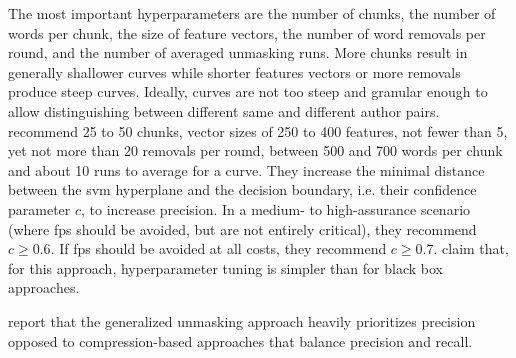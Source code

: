 The most important hyperparameters are the number of chunks, the number of words per chunk, the size of feature vectors, 
the number of word removals per round, and the number of averaged unmasking runs.
More chunks result in generally shallower curves while shorter features vectors or more removals produce steep curves.
Ideally, curves are not too steep and granular enough to allow distinguishing between different same and different author pairs.
\citet{bevendorff_bias_2019} recommend 25 to 50 chunks, vector sizes of 250 to 400 features, not fewer than 5, yet not more than 20 removals per round, 
between 500 and 700 words per chunk and about 10 runs to average for a curve.
They increase the minimal distance between the \ac{svm} hyperplane and the decision boundary, i.e. their confidence parameter $c$, to increase precision.
In a medium- to high-assurance scenario (where \acp{fp} should be avoided, but are not entirely critical), they recommend $c \geq 0.6$.
If \acp{fp} should be avoided at all costs, they recommend $c \geq 0.7$.
\citet{bevendorff_bias_2019} claim that, for this approach, hyperparameter tuning is simpler than for black box approaches.

\citet{bevendorff_bias_2019} report that the generalized unmasking approach heavily prioritizes precision 
opposed to compression-based approaches that balance precision and recall.
    